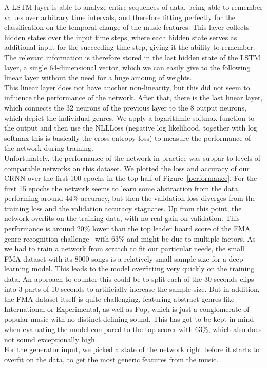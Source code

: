     A LSTM layer is able to analyze entire sequences of data, being able to remember values over arbitrary time intervals, and therefore fitting perfectly for the classification on the temporal change of the music features.
    This layer collects hidden states over the input time steps, where each hidden state serves as additional input for the succeeding time step, giving it the ability to remember.
    The relevant information is therefore stored in the last hidden state of the LSTM layer, a single 64-dimensional vector, which we can easily give to the following linear layer without the need for a huge amoung of weights.\\
    This linear layer does not have another non-linearity, but this did not seem to influence the performance of the network.
    After that, there is the last linear layer, which connects the 32 neurons of the previous layer to the 8 output neurons, which depict the individual genres.
    We apply a logarithmic softmax function to the output and then use the NLLLoss (negative log likelihood, together with log softmax this is basically the cross entropy loss) to measure the performance of the network during training.\\
    Unfortunately, the performance of the network in practice was subpar to levels of comparable networks on this dataset.
    We plotted the loss and accuracy of our CRNN over the first 100 epochs in the top half of Figure~\ref{performance}.
    For the first 15 epochs the network seems to learn some abstraction from the data, performing around 44$\%$ accuracy, but then the validation loss diverges from the training loss and the validation accuracy stagnates.
    Up from this point, the network overfits on the training data, with no real gain on validation.
    This performance is around $20\%$ lower than the top leader board score of the FMA genre recognition challenge~\cite{GenreChallenge} with 63$\%$ and might be due to multiple factors.
    As we had to train a network from scratch to fit our particular needs, the small FMA dataset with its 8000 songs is a relatively small sample size for a deep learning model.
    This leads to the model overfitting very quickly on the training data.
    An approach to counter this could be to split each of the 30 seconds clips into 3 parts of 10 seconds to artificially increase the sample size.
    But in addition, the FMA dataset itself is quite challenging, featuring abstract genres like International or Experimental, as well as Pop, which is just a conglomerate of popular music with no distinct defining sound.
    This has got to be kept in mind when evaluating the model compared to the top scorer with 63$\%$, which also does not sound exceptionally high.\\
    For the generator input, we picked a state of the network right before it starts to overfit on the data, to get the most generic features from the music. 

